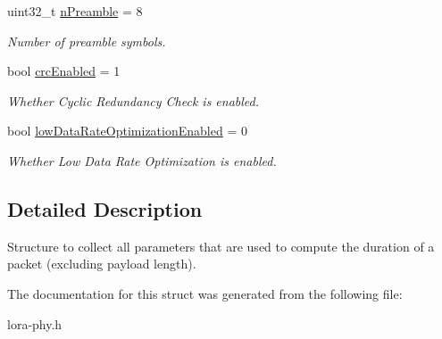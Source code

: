 \begin{DoxyCompactItemize}
uint32\+\_\+t \hyperlink{structns3_1_1lorawan_1_1LoraTxParameters_a30b4271f937cecbbff59afda7edf61fb}{n\+Preamble} = 8
\begin{DoxyCompactList}\small\item\em Number of preamble symbols. \end{DoxyCompactList}\item 
\mbox{\label{structns3_1_1lorawan_1_1LoraTxParameters_a89948e3aecca66500e212409176089bc}} 
bool \hyperlink{structns3_1_1lorawan_1_1LoraTxParameters_a89948e3aecca66500e212409176089bc}{crc\+Enabled} = 1
\begin{DoxyCompactList}\small\item\em Whether Cyclic Redundancy Check is enabled. \end{DoxyCompactList}\item 
\mbox{\label{structns3_1_1lorawan_1_1LoraTxParameters_a846813aab56780882ad9025a97968503}} 
bool \hyperlink{structns3_1_1lorawan_1_1LoraTxParameters_a846813aab56780882ad9025a97968503}{low\+Data\+Rate\+Optimization\+Enabled} = 0
\begin{DoxyCompactList}\small\item\em Whether Low Data Rate Optimization is enabled. \end{DoxyCompactList}\end{DoxyCompactItemize}


\subsection{Detailed Description}
Structure to collect all parameters that are used to compute the duration of a packet (excluding payload length). 

The documentation for this struct was generated from the following file\+:\begin{DoxyCompactItemize}
\item 
lora-\/phy.\+h\end{DoxyCompactItemize}
